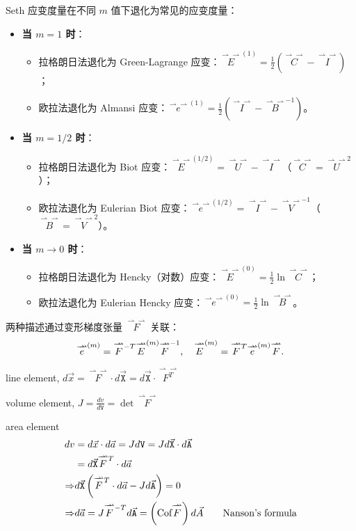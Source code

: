 \documentclass[12pt, a4paper, oneside, UTF8]{ctexbook}  %
\newcommand{\vvec}{\overset{\rightharpoonup\!\!\!\! \rightharpoonup}}
\newcommand{\X}{\mathtt{X}}
\newcommand{\lmT}{\raisebox{-0.85ex}{$\scriptstyle -T$}} %
\newcommand{\lsup}[1]{\raisebox{-0.85ex}{$\scriptstyle #1$}}
\begin{document}
\begin{defn}
Seth 应变度量在不同 \(m\) 值下退化为常见的应变度量：
\begin{itemize}
    \item \textbf{当 \(m = 1\) 时}：
        \begin{itemize}
            \item 拉格朗日法退化为 Green-Lagrange 应变：\(\vvec{E}^{(1)} = \frac{1}{2}(\vvec{C} - \vvec{I})\)；
            \item 欧拉法退化为 Almansi 应变：\(\vvec{e}^{(1)} = \frac{1}{2}(\vvec{I} - \vvec{B}^{-1})\)。
        \end{itemize}
    \item \textbf{当 \(m = 1/2\) 时}：
        \begin{itemize}
            \item 拉格朗日法退化为 Biot 应变：\(\vvec{E}^{(1/2)} = \vvec{U} - \vvec{I}\)（\(\vvec{C} = \vvec{U}^2\)）；
            \item 欧拉法退化为 Eulerian Biot 应变：\(\vvec{e}^{(1/2)} = \vvec{I} - \vvec{V}^{-1}\)（\(\vvec{B} = \vvec{V}^2\)）。
        \end{itemize}
    \item \textbf{当 \(m \to 0\) 时}：
        \begin{itemize}
            \item 拉格朗日法退化为 Hencky（对数）应变：\(\vvec{E}^{(0)} = \frac{1}{2} \ln \vvec{C}\)；
            \item 欧拉法退化为 Eulerian Hencky 应变：\(\vvec{e}^{(0)} = \frac{1}{2} \ln \vvec{B}\)。
        \end{itemize}
\end{itemize}

两种描述通过变形梯度张量 \(\vvec{F}\) 关联：
\[
\vvec{e}^{(m)} = \vvec{F}^{\lmT} \vvec{E}^{(m)} \vvec{F}^{-1}, \quad \vvec{E}^{(m)} = \vvec{F}^{\lsup{T}} \vvec{e}^{(m)} \vvec{F}.
\]
\end{defn}
\begin{add}
	line element, \(d\vec{x} = \vvec{F} \cdot d\vec{\X}=d\vec{\X} \cdot \vvec{F^T}\)	
	
	volume element, \(J=\frac{dv}{d\mathtt{V}}=\det\vvec{F}\)
\end{add}
\begin{defn}
	area element
	\begin{align*}
		dv&=d\vec{x}\cdot d\vec{a}=Jd\mathtt{V}=Jd\vec{\X}\cdot d\vec{\mathtt{A}}\\
		&=d\vec{\X}\vvec{F}^{\lsup{T}}\cdot d\vec{a}\\
		\Rightarrow&d\vec{\X}\left(\vvec{F}^{\lsup{T}}\cdot d\vec{a}-Jd\vec{\mathtt{A}}\right)=0\\
		\Rightarrow&d\vec{a}=J\vvec{F}^{\lmT}d\vec{\mathtt{A}}
		=\left(\text{Cof}\vvec{F}\right)d\vec{A}\quad\quad\text{Nanson's formula}
	\end{align*}
\end{defn}
\end{document}

